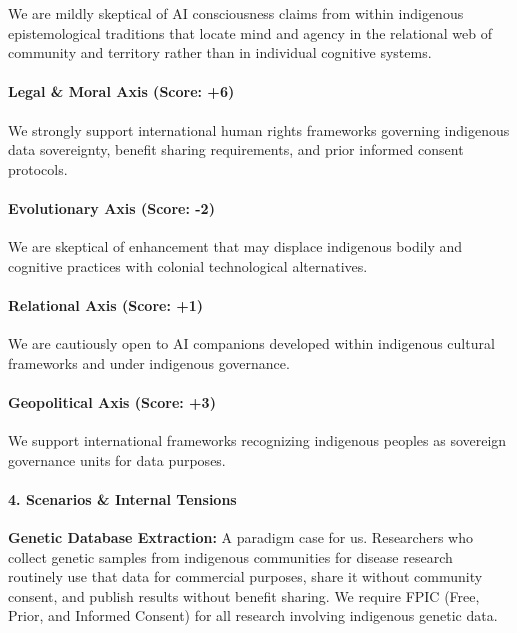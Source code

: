 We are mildly skeptical of AI consciousness claims from within
indigenous epistemological traditions that locate mind and agency in the
relational web of community and territory rather than in individual
cognitive systems.

\paragraph{Legal \& Moral Axis (Score:
+6)}\label{legal-moral-axis-score-6-4}

We strongly support international human rights frameworks governing
indigenous data sovereignty, benefit sharing requirements, and prior
informed consent protocols.

\paragraph{Evolutionary Axis (Score:
-2)}\label{evolutionary-axis-score--2-6}

We are skeptical of enhancement that may displace indigenous bodily and
cognitive practices with colonial technological alternatives.

\paragraph{Relational Axis (Score: +1)}\label{relational-axis-score-1-1}

We are cautiously open to AI companions developed within indigenous
cultural frameworks and under indigenous governance.

\paragraph{Geopolitical Axis (Score:
+3)}\label{geopolitical-axis-score-3-3}

We support international frameworks recognizing indigenous peoples as
sovereign governance units for data purposes.

\paragraph{4. Scenarios \& Internal
Tensions}\label{scenarios-internal-tensions-45}

\textbf{Genetic Database Extraction:} A paradigm case for us.
Researchers who collect genetic samples from indigenous communities for
disease research routinely use that data for commercial purposes, share
it without community consent, and publish results without benefit
sharing. We require FPIC (Free, Prior, and Informed Consent) for all
research involving indigenous genetic data.

